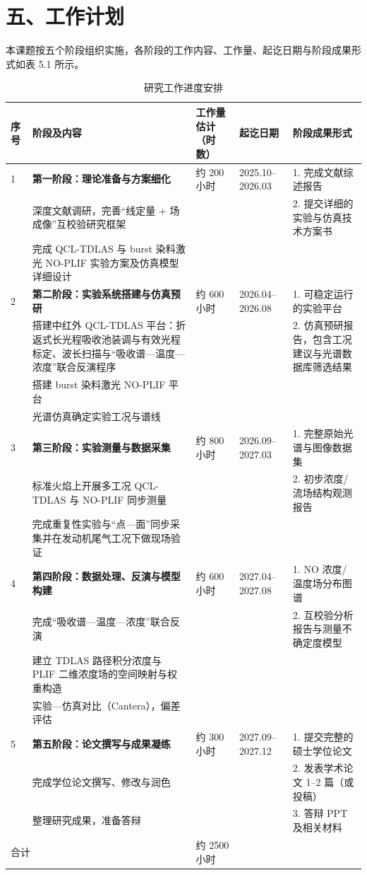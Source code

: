 
\chapter{五、工作计划}

本课题按五个阶段组织实施，各阶段的工作内容、工作量、起讫日期与阶段成果形式如表 5.1 所示。

\begin{table}[htbp]
  \centering
  \caption{研究工作进度安排}
  \label{tab:plan}
  \begin{tabular}{p{0.6cm}p{4.7cm}p{1.8cm}p{2.1cm}p{3.2cm}}
    \hline
    序号 & 阶段及内容 & 工作量估计（时数） & 起讫日期 & 阶段成果形式 \\
    \hline
    1 & \textbf{第一阶段：理论准备与方案细化} & 约 200 小时 & 2025.10--2026.03 & 1. 完成文献综述报告 \\
      & 深度文献调研，完善``线定量 + 场成像''互校验研究框架 & & & 2. 提交详细的实验与仿真技术方案书 \\
      & 完成 QCL-TDLAS 与 burst 染料激光 NO-PLIF 实验方案及仿真模型详细设计 & & & \\
    \hline
    2 & \textbf{第二阶段：实验系统搭建与仿真预研} & 约 600 小时 & 2026.04--2026.08 & 1. 可稳定运行的实验平台 \\
      & 搭建中红外 QCL-TDLAS 平台：折返式长光程吸收池装调与有效光程标定、波长扫描与``吸收谱—温度—浓度''联合反演程序 & & & 2. 仿真预研报告，包含工况建议与光谱数据库筛选结果 \\
      & 搭建 burst 染料激光 NO-PLIF 平台 & & & \\
      & 光谱仿真确定实验工况与谱线 & & & \\
    \hline
    3 & \textbf{第三阶段：实验测量与数据采集} & 约 800 小时 & 2026.09--2027.03 & 1. 完整原始光谱与图像数据集 \\
      & 标准火焰上开展多工况 QCL-TDLAS 与 NO-PLIF 同步测量 & & & 2. 初步浓度/流场结构观测报告 \\
      & 完成重复性实验与``点—面''同步采集并在发动机尾气工况下做现场验证 & & & \\
    \hline
    4 & \textbf{第四阶段：数据处理、反演与模型构建} & 约 600 小时 & 2027.04--2027.08 & 1. NO 浓度/温度场分布图谱 \\
      & 完成``吸收谱—温度—浓度''联合反演 & & & 2. 互校验分析报告与测量不确定度模型 \\
      & 建立 TDLAS 路径积分浓度与 PLIF 二维浓度场的空间映射与权重构造 & & & \\
      & 实验—仿真对比（Cantera），偏差评估 & & & \\
    \hline
    5 & \textbf{第五阶段：论文撰写与成果凝练} & 约 300 小时 & 2027.09--2027.12 & 1. 提交完整的硕士学位论文 \\
      & 完成学位论文撰写、修改与润色 & & & 2. 发表学术论文 1--2 篇（或投稿） \\
      & 整理研究成果，准备答辩 & & & 3. 答辩 PPT 及相关材料 \\
    \hline
    \multicolumn{2}{l}{合计} & 约 2500 小时 & & \\
    \hline
  \end{tabular}
\end{table}
